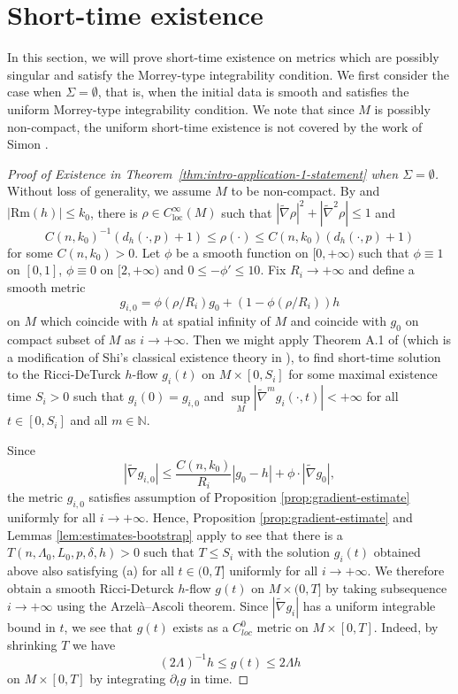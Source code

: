 \documentclass[12pt]{amsart}
\theoremstyle{plain}
\theoremstyle{plain}
\theoremstyle{definition}
\theoremstyle{remark}
\numberwithin{equation}{subsection}
\newcommand{\hdel}{\tilde{\nabla}}
\begin{document}
\section{Short-time existence}\label{sec:proof-of-main-theorem}
In this section, we will prove short-time existence on metrics which are possibly singular and satisfy the Morrey-type integrability condition. We first consider the case when $\Sigma=\emptyset$, that is, when the initial data is smooth and satisfies the uniform Morrey-type integrability condition. We note that since $M$ is possibly non-compact, the uniform short-time existence is not covered by the work of Simon \cite{simon_deformation_2002}.
\begin{proof}[Proof of Existence in Theorem~\ref{thm:intro-application-1-statement} when $\Sigma=\emptyset$]

Without loss of generality, we assume $M$ to be non-compact. By \cite{tam_exhaustion_2010} and $|\text{Rm}(h)|\leq k_0$, there is $\rho \in C^\infty_\text{loc}(M)$ such that $|\hdel \rho|^2 + |\hdel^2 \rho| \leq 1$ and
    \begin{equation*}
        C(n,k_0)^{-1}(d_h(\cdot, p)+1)\leq \rho(\cdot) \leq  C(n,k_0)(d_h(\cdot,p) + 1)
    \end{equation*}
    for some $ C(n,k_0)>0$. Let $\phi$ be a smooth function on $[0,+\infty)$ such that $\phi \equiv 1$ on $[0,1]$, $\phi \equiv 0$ on $[2,+\infty)$ and $0\leq-\phi'\leq 10$. Fix $R_i\to+\infty$ and define a smooth metric 
    $$g_{i,0}=\phi(\rho/R_i)g_0+(1-\phi(\rho/R_i)) h$$
on $M$ which coincide with $h$ at spatial infinity of $M$ and coincide with $g_0$ on compact subset of $M$ as $i\to+\infty$. Then we might apply Theorem A.1 of \cite{lamm_ricci_2021} (which is a modification of Shi's classical existence theory in \cite{shi_deforming_1989}), to find  short-time solution to the Ricci-DeTurck $h$-flow $g_i(t)$ on $M \times [0,S_i]$ for some maximal existence time $S_i > 0$ such that $g_i(0) = g_{i,0}$ and $\sup\limits_M |\hdel^m g_i(\cdot, t)|<+\infty$ for all $t \in [0, S_i]$ and all $m\in \mathbb{N}$. 

Since 
\begin{equation}
|\hdel g_{i,0}|\leq \frac{C(n,k_0)}{R_i}|g_0-h|+\phi\cdot |\hdel g_0|,
\end{equation}
the metric $g_{i,0}$ satisfies assumption of  Proposition \ref{prop:gradient-estimate} uniformly for all $i\to+\infty$. Hence, Proposition \ref{prop:gradient-estimate} and Lemmas \ref{lem:estimates-bootstrap} apply to see that there is a $T(n, \Lambda_0, L_0, p, \delta,h) > 0$ such that $T \leq S_i$ with the solution $g_i(t)$ obtained above also satisfying (a) for all $t \in (0, T]$ uniformly for all $i\to+\infty$. We therefore obtain a smooth Ricci-Deturck $h$-flow $g(t)$ on $M\times (0,T]$ by taking subsequence $i\to+\infty$ using  the Arzel\`a--Ascoli theorem. Since $|\hdel g_i|$ has a uniform integrable bound in $t$, we see that $g(t)$ exists as a $C^0_{loc}$ metric on $M\times [0,T]$. Indeed, by shrinking $T$ we have 
\begin{equation}
(2\Lambda)^{-1}h\leq g(t)\leq 2\Lambda h
\end{equation}
on $M\times [0,T]$ by integrating $\partial_t g$ in time.  
\end{proof}
\end{document}

